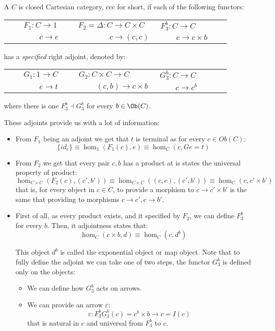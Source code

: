 \begin{definition}\label{def:CCC}
  A $C$ is closed Cartesian category, ccc for short, if each of the following functors:
  \begin{center}
    \begin{tabular}{p{0.3\linewidth}p{0.3\linewidth}p{0.3\linewidth}}
      $\qquad F_1:C\to 1$&$ F_2=\Delta: C \to C\times C $&$ F_{3}^b:C \to C$\\
      $\qquad \qquad c\to e$&$ \qquad \qquad c \to  (c,c)$&$ \qquad c \to c\times b$\\
    \end{tabular}
  \end{center}
  has a \emph{specified} right adjoint, denoted by:
  \begin{center}
    \begin{tabular}{p{0.3\linewidth}p{0.3\linewidth}p{0.3\linewidth}}
      $\qquad G_1:1\to C$&$ G_2:  C\times C\to C $&$ G_{3}^b:C \to C$\\
      $\qquad \qquad e\to t$&$ \  \qquad (c,b)\to c \times b$&$ \qquad c \to c^b$\\
    \end{tabular}
    where there is one $F_3^b\dashv G_3^b$ for every $b\in \Ob(C)$.
  \end{center}

  These adjoints provide us with a lot of information:
  \begin{itemize}
  \item From $F_1$ being an adjoint we get that $t$ is terminal as for every $c\in Ob(C)$:
    $$\{id_e\} \equiv \hom_1(F_1(c), e) \equiv \hom_C(c,Ge=t)   $$
  \item From $F_2$ we get that every pair $c,b$ has a product at is states the universal property of product:
    $$\hom_{C\times C}(F_2(c), (c',b'))\equiv \hom_{C\times C}((c,c), (c',b')) \equiv \hom_C(c,c'\times b')$$
    that is, for every object in $c\in C$, to provide a morphism to $c\to c'\times b'$ is the same that providing to morphisms $c\to c',c\to b'$.
  \item First of all, as every product exists, and it specified by $F_2$, we can define $F_3^b$ for every $b$. Then, it adjointness states that:
    $$\hom_C(c\times b, d) \equiv \hom_C(c,d^b)   $$

    This object $d^b$ is called the exponential object or map object. Note that to fully define the adjoint we can take one of two steps,  the functor $G_3^b$ is defined only on the objects:
    \begin{itemize}
    \item We can define how $G_3^b$ acts on arrows.
    \item We can  provide an arrow $\varepsilon$:
      $$\varepsilon: F_3^bG_3^b(c) = c^b\times b \to c = I(c)$$
      that is natural in $c$ and universal from $F_3^b$ to $c$.
    \end{itemize}


\end{itemize}
\end{definition}
